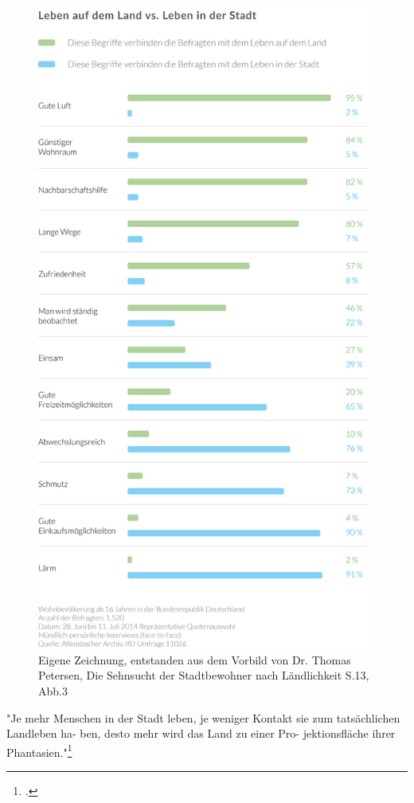 \documentclass{scrartcl}
\begin{document}
\begin{figure}[htbp]
\centering
\includegraphics[width=11cm]{image_folder/SchaubildStadtVsLand_Umfrage.png}
\caption{Eigene Zeichnung, entstanden aus dem Vorbild von Dr. Thomas Petersen, Die Sehnsucht der Stadtbewohner nach Ländlichkeit S.13, Abb.3}
\label{fig:SchaubildStadtVsLandUmfrage}
\end{figure}

\begin{displayquote}
"Je mehr Menschen in der Stadt leben, je weniger Kontakt sie zum tatsächlichen Landleben ha- ben, desto mehr wird das Land zu einer Pro- jektionsfläche ihrer Phantasien."\footcite[S. 8]{Dr.ThomasPetersen2014DieLandlichkeit}
\end{displayquote}
\end{document}
